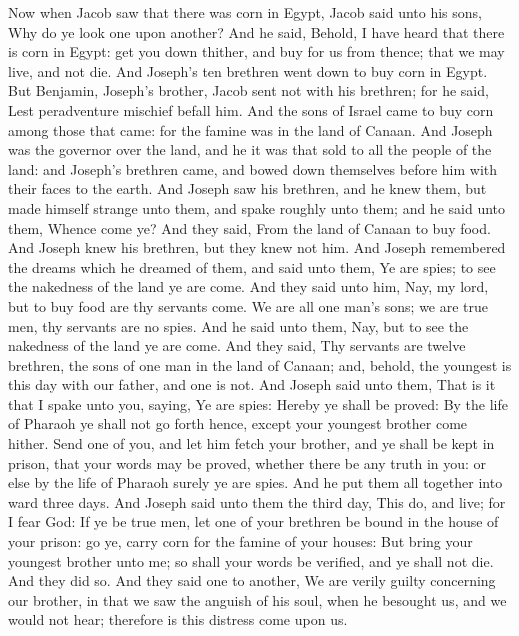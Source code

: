 \begin{biblechapter} %
 Now when Jacob saw that there was corn in Egypt, Jacob said unto his sons, Why do ye look one upon another?
\verse And he said, Behold, I have heard that there is corn in Egypt: get you down thither, and buy for us from thence; that we may live, and not die.
\verse And Joseph's ten brethren went down to buy corn in Egypt.
\verse But Benjamin, Joseph's brother, Jacob sent not with his brethren; for he said, Lest peradventure mischief befall him.
\verse And the sons of Israel came to buy corn among those that came: for the famine was in the land of Canaan.
\verse And Joseph was the governor over the land, and he it was that sold to all the people of the land: and Joseph's brethren came, and bowed down themselves before him with their faces to the earth.
\verse And Joseph saw his brethren, and he knew them, but made himself strange unto them, and spake roughly unto them; and he said unto them, Whence come ye? And they said, From the land of Canaan to buy food.
\verse And Joseph knew his brethren, but they knew not him.
\verse And Joseph remembered the dreams which he dreamed of them, and said unto them, Ye are spies; to see the nakedness of the land ye are come.
\verse And they said unto him, Nay, my lord, but to buy food are thy servants come.
\verse We are all one man's sons; we are true men, thy servants are no spies.
\verse And he said unto them, Nay, but to see the nakedness of the land ye are come.
\verse And they said, Thy servants are twelve brethren, the sons of one man in the land of Canaan; and, behold, the youngest is this day with our father, and one is not.
\verse And Joseph said unto them, That is it that I spake unto you, saying, Ye are spies:
\verse Hereby ye shall be proved: By the life of Pharaoh ye shall not go forth hence, except your youngest brother come hither.
\verse Send one of you, and let him fetch your brother, and ye shall be kept in prison, that your words may be proved, whether there be any truth in you: or else by the life of Pharaoh surely ye are spies.
\verse And he put them all together into ward three days.
\verse And Joseph said unto them the third day, This do, and live; for I fear God:
\verse If ye be true men, let one of your brethren be bound in the house of your prison: go ye, carry corn for the famine of your houses:
\verse But bring your youngest brother unto me; so shall your words be verified, and ye shall not die. And they did so.
\verse And they said one to another, We are verily guilty concerning our brother, in that we saw the anguish of his soul, when he besought us, and we would not hear; therefore is this distress come upon us.

\end{biblechapter}
